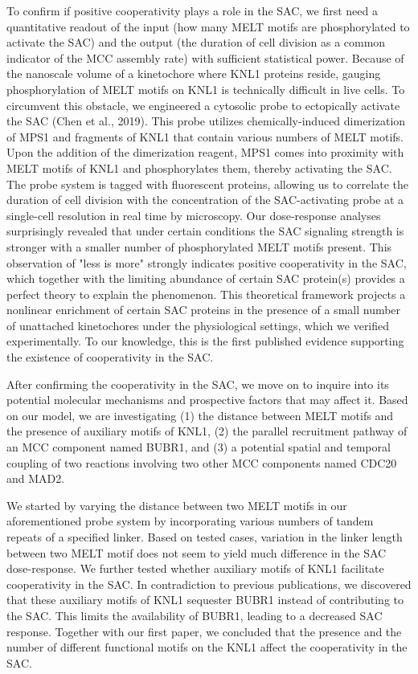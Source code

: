 To confirm if positive cooperativity plays a role in the SAC, we first need a quantitative readout of the input (how many MELT motifs are phosphorylated to activate the SAC) and the output (the duration of cell division as a common indicator of the MCC assembly rate) with sufficient statistical power. Because of the nanoscale volume of a kinetochore where KNL1 proteins reside, gauging phosphorylation of MELT motifs on KNL1 is technically difficult in live cells. To circumvent this obstacle, we engineered a cytosolic probe to ectopically activate the SAC (Chen et al., 2019). This probe utilizes chemically-induced dimerization of MPS1 and fragments of KNL1 that contain various numbers of MELT motifs. Upon the addition of the dimerization reagent, MPS1 comes into proximity with MELT motifs of KNL1 and phosphorylates them, thereby activating the SAC. The probe system is tagged with fluorescent proteins, allowing us to correlate the duration of cell division with the concentration of the SAC-activating probe at a single-cell resolution in real time by microscopy. Our dose-response analyses surprisingly revealed that under certain conditions the SAC signaling strength is stronger with a smaller number of phosphorylated MELT motifs present. This observation of "less is more" strongly indicates positive cooperativity in the SAC, which together with the limiting abundance of certain SAC protein(s) provides a perfect theory to explain the phenomenon. This theoretical framework projects a nonlinear enrichment of certain SAC proteins in the presence of a small number of unattached kinetochores under the physiological settings, which we verified experimentally. To our knowledge, this is the first published evidence supporting the existence of cooperativity in the SAC.

After confirming the cooperativity in the SAC, we move on to inquire into its potential molecular mechanisms and prospective factors that may affect it. Based on our model, we are investigating (1) the distance between MELT motifs and the presence of auxiliary motifs of KNL1, (2) the parallel recruitment pathway of an MCC component named BUBR1, and (3) a potential spatial and temporal coupling of two reactions involving two other MCC components named CDC20 and MAD2.

We started by varying the distance between two MELT motifs in our aforementioned probe system by incorporating various numbers of tandem repeats of a specified linker. Based on tested cases, variation in the linker length between two MELT motif does not seem to yield much difference in the SAC dose-response. We further tested whether auxiliary motifs of KNL1 facilitate cooperativity in the SAC. In contradiction to previous publications, we discovered that these auxiliary motifs of KNL1 sequester BUBR1 instead of contributing to the SAC. This limits the availability of BUBR1, leading to a decreased SAC response. Together with our first paper, we concluded that the presence and the number of different functional motifs on the KNL1 affect the cooperativity in the SAC.

